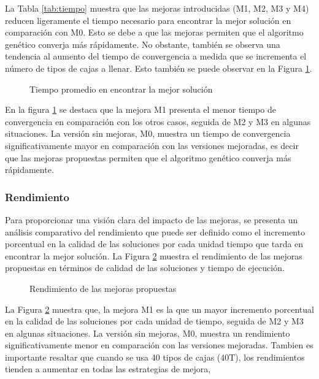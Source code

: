 La Tabla \ref{tab:tiempo} muestra que las mejoras introducidas (M1, M2, M3 y M4) reducen ligeramente el tiempo necesario para encontrar la mejor solución en comparación con M0. Esto se debe a que las mejoras permiten que el algoritmo genético converja más rápidamente. No obstante, también se observa una tendencia al aumento del tiempo de convergencia a medida que se incrementa el número de tipos de cajas a llenar. Esto también se puede observar en la Figura \ref{fig:tiempos}.

\begin{figure}[H]
    \centering
    
    \caption{Tiempo promedio en encontrar la mejor solución}
    \label{fig:tiempos}
\end{figure}

En la figura \ref{fig:tiempos} se destaca que la mejora M1 presenta el menor tiempo de convergencia en comparación con los otros casos, seguida de M2 y M3 en algunas situaciones. La versión sin mejoras, M0, muestra un tiempo de convergencia significativamente mayor en comparación con las versiones mejoradas, es decir que las mejoras propuestas permiten que el algoritmo genético converja más rápidamente.

\subsubsection{Rendimiento}

Para proporcionar una visión clara del impacto de las mejoras, se presenta un análisis comparativo del rendimiento que puede ser definido como el incremento porcentual en la calidad de las soluciones por cada unidad tiempo que tarda en encontrar la mejor solución. La Figura \ref{fig:rendimiento} muestra el rendimiento de las mejoras propuestas en términos de calidad de las soluciones y tiempo de ejecución.

\begin{figure}[H]
    \centering
    
    \caption{Rendimiento de las mejoras propuestas}
    \label{fig:rendimiento}
\end{figure}

La Figura \ref{fig:rendimiento} muestra que, la mejora M1 es la que un mayor incremento porcentual en la calidad de las soluciones por cada unidad de tiempo, seguida de M2 y M3 en algunas situaciones. La versión sin mejoras, M0, muestra un rendimiento significativamente menor en comparación con las versiones mejoradas. Tambien es importante resaltar que cuando se usa 40 tipos de cajas (40T), los rendimientos tienden a aumentar en todas las estrategias de mejora,

